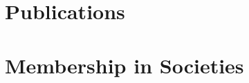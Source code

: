 \documentclass[9pt]{res}
\begin{document}
\begin{resume}

\section{Publications}
\vspace{0.1in}


%

\section{Membership in Societies}
\vspace*{-0.01in}
 

\end{resume}
\end{document}
